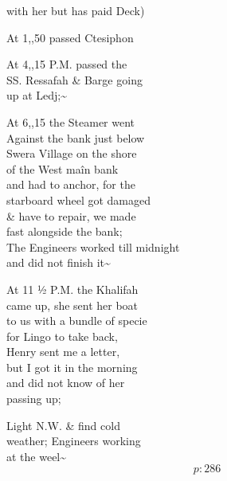 \documentclass{report}
\begin{document}


	\par{
 	with her but has paid Deck)\ \\
	}

	\par{
 	At 1,,50 passed Ctesiphon\ \\
	}

	\par{
 	At 4,,15 P.M. passed the\ \\SS. Ressafah \& Barge going\ \\up at Ledj;\~{}\ \\
	}

	\par{
 	At 6,,15 the Steamer went\ \\Against the bank just below\ \\Swera Village on the shore\ \\of the West maîn bank\ \\and had to anchor, for the\ \\starboard wheel got damaged\ \\\& have to repair, we made\ \\fast alongside the bank;\ \\The Engineers worked till midnight\ \\and did not finish it\~{}\ \\
	}

	\par{
 	At 11 ½ P.M. the Khalifah\ \\came up, she sent her boat\ \\to us with a bundle of specie\ \\for Lingo to take back,\ \\Henry sent me a letter,\ \\but I got it in the morning\ \\and did not know of her\ \\passing up;\ \\
	}

	\par{
 	Light N.W. \& find cold\ \\weather; Engineers working\ \\at the weel\~{}\ \\
  \[p: 286 \]

	}

\end{document}
